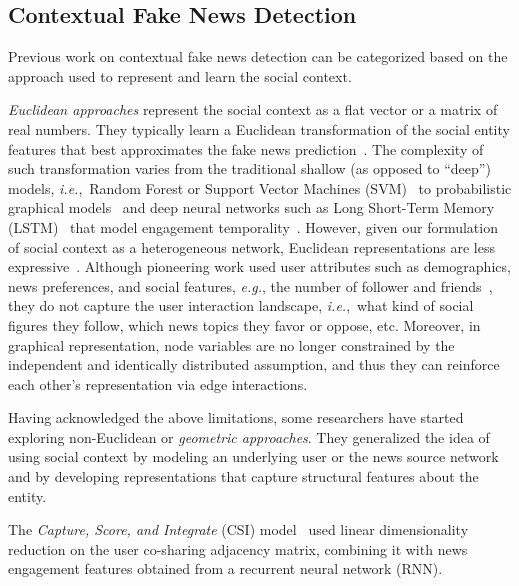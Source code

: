 \documentclass[sigconf]{acmart}
\theoremstyle{definition}
\theoremstyle{hypothesis}
\begin{document}


\subsection{Contextual Fake News Detection}
Previous work on contextual fake news detection can be categorized based on the approach used to represent and learn the social context. 

\emph{Euclidean approaches} represent the social context as a flat vector or a matrix of real numbers. 
They typically learn a Euclidean transformation of the social entity features that best approximates the fake news prediction~\cite{popat2016credibility}. The complexity of such transformation varies from the traditional shallow (as opposed to ``deep'') models, \textit{i.e.},~Random Forest or Support Vector Machines (SVM)~\cite{castillo2011information,yang2012automatic} to probabilistic graphical models~\cite{popat2017truth} and deep neural networks such as Long Short-Term Memory (LSTM)~\cite{lstm1997hochreiter} that model engagement temporality~\cite{ruchansky2017csi}. However, given our formulation of social context as a heterogeneous network, Euclidean representations are less expressive~\cite{bronstein2017geometric}. Although pioneering work used user attributes such as demographics, news preferences, and social features, \emph{e.g.}, the number of follower and friends~\cite{ma2015detect,shu2017fake}, they do not capture the user interaction landscape, \textit{i.e.},~what kind of social figures they follow, which news topics they favor or oppose, etc. Moreover, in graphical representation, node variables are no longer constrained by the independent and identically distributed assumption, and thus they can reinforce each other's representation via edge interactions.

Having acknowledged the above limitations, some researchers have started exploring non-Euclidean or \emph{geometric approaches}. They generalized the idea of using social context by modeling an underlying user or the news source network and by developing representations that capture structural features about the entity.

The \emph{Capture, Score, and Integrate} (CSI) model~\cite{ruchansky2017csi} used linear dimensionality reduction on the user co-sharing adjacency matrix, combining it with news engagement features obtained from a recurrent neural network (RNN). 
\end{document}
